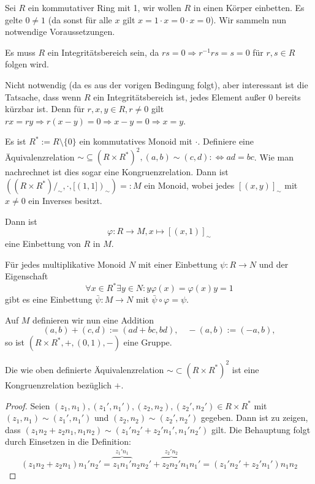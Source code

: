 \begin{remark}
    Sei $R$ ein kommutativer Ring mit 1, wir wollen $R$ in einen Körper einbetten. Es gelte \obda $0 \neq 1$ (da sonst für alle $x$ gilt $ x = 1\cdot x = 0 \cdot x = 0$). Wir sammeln nun notwendige Voraussetzungen.

    Es muss $R$ ein Integritätsbereich sein, da $rs=0\Rightarrow r^{-1}rs=s=0$ für $r,s\in R$ folgen wird.

    Nicht notwendig (da es aus der vorigen Bedingung folgt), aber interessant ist die Tatsache, dass wenn $R$ ein Integritätsbereich ist, jedes Element außer $0$ bereits kürzbar ist.
    Denn für $r,x,y\in R,r\neq 0$ gilt $rx=ry\Rightarrow r(x-y)=0\Rightarrow x-y=0\Rightarrow x=y$.

    Es ist $R^* := R \setminus \{0\}$ ein kommutatives Monoid mit $\cdot$. Definiere eine Äquivalenzrelation $\sim \subseteq (R \times R^*)^2, (a, b) \sim (c, d) :\Leftrightarrow ad = bc$. Wie man nachrechnet ist dies sogar eine Kongruenzrelation. Dann ist $((R \times R^*)/_\sim, \cdot, [(1,1])_\sim) =: M$ ein Monoid, wobei jedes $[(x,y)]_\sim$ mit $x \neq 0$ ein Inverses besitzt.
    
    Dann ist
    $$ \varphi : R \to M, x \mapsto [(x, 1)]_\sim $$
    eine Einbettung von $R$ in $M$.

    Für jedes multiplikative Monoid $N$ mit einer Einbettung $\psi : R \to N$ und der Eigenschaft
    $$\forall x\in R^*\exists y\in N:y\varphi(x)=\varphi(x)y=1$$
    gibt es eine Einbettung $\bar{\psi} : M \to N$ mit $\bar{\psi} \circ \varphi = \psi$.

    Auf $M$ definieren wir nun eine Addition
    $$ (a,b) + (c,d) := (ad+bc, bd), \quad -(a,b) := (-a, b), $$
    so ist $(R \times R^*, +, (0,1), -)$ eine Gruppe.
\end{remark}

\begin{lemma}
    Die wie oben definierte Äquivalenzrelation $\sim \subset (R \times R^*)^2$ ist eine Kongruenzrelation bezüglich $+$.
\end{lemma}

\begin{proof}
    Seien $(z_1,n_1),(z_1',n_1'),(z_2,n_2),(z_2',n_2')\in R\times R^*$ mit $(z_1,n_1)\sim (z_1',n_1')$ und $(z_2,n_2)\sim (z_2',n_2')$ gegeben.
    Dann ist zu zeigen, dass $(z_1n_2+z_2n_1,n_1n_2)\sim (z_1'n_2'+z_2'n_1',n_1'n_2')$ gilt. Die Behauptung folgt durch Einsetzen
    in die Definition:
    $$(z_1n_2+z_2n_1)n_1'n_2'=\overbrace{z_1n_1'}^{z_1'n_1}n_2n_2'+\overbrace{z_2n_2'}^{z_2'n_2}n_1n_1'=(z_1'n_2'+z_2'n_1')n_1n_2$$
\end{proof}


